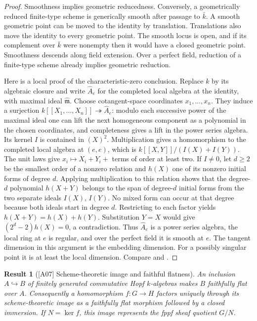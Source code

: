 \documentclass[11pt,a4paper,openany,oneside]{book}
\theoremstyle{resultstyle}
\newtheorem{statement}{Result}[chapter]
\newenvironment{result}[2]{\clubpenalty=10000\begin{statement}[\textnormal{[#1]} #2]\leavevmode\label{res:#1}\ignorespaces}{\end{statement}}
\theoremstyle{definition}
\numberwithin{equation}{chapter}
\begin{document}
\begin{proof}
Smoothness implies geometric reducedness. Conversely, a geometrically
reduced finite-type scheme is generically smooth after passage to
\(\bar k\). A smooth geometric point can be moved to the identity by
translation. Translations also move the identity to every geometric
point. The smooth locus is open, and if its complement over \(\bar k\)
were nonempty then it would have a closed geometric point. Smoothness
descends along field extension. Over a perfect field, reduction of a
finite-type scheme already implies geometric reduction.

Here is a local proof of the characteristic-zero conclusion. Replace
\(k\) by its algebraic closure and write \(\widehat A_e\) for the completed local algebra
at the identity, with maximal ideal \(\widehat{\mathfrak m}\). Choose
cotangent-space coordinates \(x_1,\ldots,x_n\). They induce a surjection
\(k[[X_1,\ldots,X_n]]\twoheadrightarrow\widehat A_e\): modulo each
successive power of the maximal ideal one can lift the next homogeneous
component as a polynomial in the chosen coordinates, and completeness
gives a lift in the power series algebra. Its kernel \(I\) is contained
in \((X)^2\). Multiplication gives a homomorphism to the completed local
algebra at \((e,e)\), which is \(k[[X,Y]]/(I(X)+I(Y))\).
The unit laws give \(x_i\mapsto X_i+Y_i+\) terms of order at least two.
If \(I\ne0\), let \(d\ge2\) be the smallest order of a nonzero relation
and \(h(X)\) one of its nonzero initial forms of degree \(d\).
Applying multiplication to this relation shows that the degree-\(d\)
polynomial \(h(X+Y)\) belongs to the span of degree-\(d\) initial forms
from the two separate ideals \(I(X)\), \(I(Y)\). No mixed form can occur
at that degree because both ideals start in degree \(d\). Restricting
to each factor yields \(h(X+Y)=h(X)+h(Y)\).
Substitution \(Y=X\) would give \((2^d-2)h(X)=0\), a contradiction.
Thus \(\widehat A_e\) is a power series algebra, the local ring at
\(e\) is regular, and over the perfect field it is smooth at \(e\).
The tangent dimension in this argument is the embedding dimension.
For a possibly singular point it is at least the local dimension.
Compare \cite[Propositions 1.26--1.28 and Theorem 3.23]{milne}
and \cite[p.~13 correction]{milneerrata}.
\end{proof}

\begin{result}{A07}{Scheme-theoretic image and faithful flatness}
An inclusion \(A\hookrightarrow B\) of finitely generated commutative
Hopf \(k\)-algebras makes \(B\) faithfully flat over \(A\). Consequently
a homomorphism \(f:G\to H\) factors uniquely through its
scheme-theoretic image as a faithfully flat morphism followed by a
closed immersion. If \(N=\ker f\), this image represents the fppf sheaf
quotient \(G/N\).
\end{result}
\end{document}
